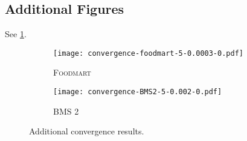 %
%
%
%
%
%

\subsection{Additional Figures}\label{sec:addarsd}
See \cref{fig:addarsd}.

\begin{figure}[hbt]
  \centering
  \begin{subfigure}{0.40\textwidth}
    \centering
    \texttt{[image: convergence-foodmart-5-0.0003-0.pdf]} %
    \caption{\textsc{Foodmart}}
  \end{subfigure}%

  \centering
  \begin{subfigure}{0.40\textwidth}
    \texttt{[image: convergence-BMS2-5-0.002-0.pdf]} %
    \caption{\textsc{BMS 2}}
  \end{subfigure}
  \caption{Additional convergence results.}\label{fig:addarsd}
\end{figure}
